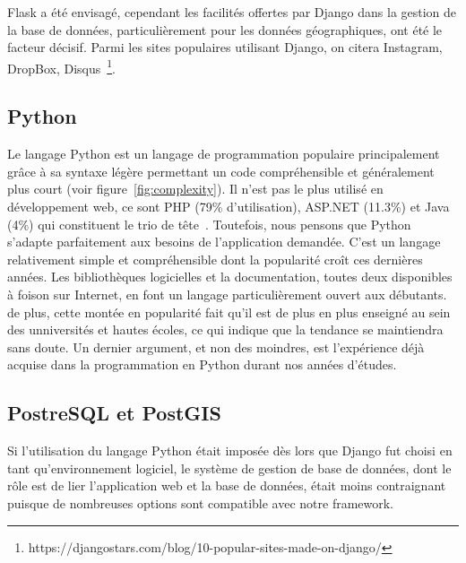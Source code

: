 \documentclass{EPL-master-thesis-covers-FR}
\begin{document}
					Flask a été envisagé, cependant les facilités offertes par Django dans la gestion de la base de données, particulièrement pour les données géographiques, ont été le facteur décisif. Parmi les sites populaires utilisant Django, on citera Instagram, DropBox, Disqus~\footnote{https://djangostars.com/blog/10-popular-sites-made-on-django/}.

			\subsection*{Python}
				Le langage Python est un langage de programmation populaire principalement grâce à sa syntaxe légère permettant un code compréhensible et généralement plus court (voir figure~\ref{fig:complexity}). Il n'est pas le plus utilisé en développement web, ce sont PHP (79\% d'utilisation), ASP.NET (11.3\%) et Java (4\%) qui constituent le trio de tête~\cite{ref:popular_programming_languages}. Toutefois, nous pensons que Python s'adapte parfaitement aux besoins de l'application demandée. C'est un langage relativement simple et compréhensible dont la popularité croît ces dernières années. Les bibliothèques logicielles et la documentation, toutes deux disponibles à foison sur Internet, en font un langage particulièrement ouvert aux débutants. de plus, cette montée en popularité fait qu'il est de plus en plus enseigné au sein des unniversités et hautes écoles, ce qui indique que la tendance se maintiendra sans doute. Un dernier argument, et non des moindres, est l'expérience déjà acquise dans la programmation en Python durant nos années d'études.

			\subsection*{PostreSQL et PostGIS}

				Si l'utilisation du langage Python était imposée dès lors que Django fut choisi en tant qu'environnement logiciel, le système de gestion de base de données, dont le rôle est de lier l'application web et la base de données, était moins contraignant puisque de nombreuses options sont compatible avec notre framework.
\end{document}
